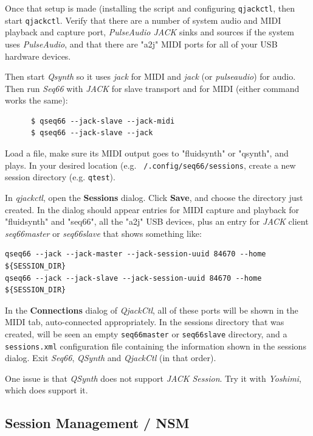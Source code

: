    Once that setup is made (installing the script and configuring
   \texttt{qjackctl}, then start \texttt{qjackctl}.
   Verify that there are a number of system audio and MIDI playback and capture
   port, \textsl{PulseAudio JACK} sinks and sources if the system uses
   \textsl{PulseAudio}, and that there are "a2j" MIDI ports for all of your USB
   hardware devices.

   Then start \textsl{Qsynth} so it uses \textsl{jack} for MIDI and
   \textsl{jack} (or \textsl{pulseaudio}) for audio.
   Then run \textsl{Seq66} with \textsl{JACK} for slave transport and for MIDI
   (either command works the same):

   \begin{verbatim}
      $ qseq66 --jack-slave --jack-midi
      $ qseq66 --jack-slave --jack
   \end{verbatim}

   Load a file, make sure its MIDI output goes to "fluidsynth" or "qsynth", and
   plays.
   In your desired location (e.g. \texttt{~/.config/seq66/sessions},
   create a new session directory (e.g. \texttt{qtest}).

   In \textsl{qjackctl}, open the \textbf{Sessions} dialog.
   Click \textbf{Save}, and choose the directory just created.
   In the dialog should appear entries for MIDI capture and playback for
   "fluidsynth" and "seq66", all the "a2j" USB devices,
   plus an entry for \textsl{JACK} client
   \textsl{seq66master} or \textsl{seq66slave} that shows
   something like:

   \begin{verbatim}
qseq66 --jack --jack-master --jack-session-uuid 84670 --home ${SESSION_DIR}
qseq66 --jack --jack-slave --jack-session-uuid 84670 --home ${SESSION_DIR}
   \end{verbatim}

   In the \textbf{Connections} dialog of \textsl{QjackCtl}, all of these ports
   will be shown in the MIDI tab, auto-connected appropriately.
   In the sessions directory that was created, will be seen an
   empty \texttt{seq66master}
   or \texttt{seq66slave} directory, and a
   \texttt{sessions.xml} configuration file containing the information shown in
   the sessions dialog.
   Exit \textsl{Seq66}, \textsl{QSynth} and \textsl{QjackCtl}
   (in that order).

   One issue is that \textsl{QSynth}
   does not support \textsl{JACK Session}.
   Try it with \textsl{Yoshimi}, which does support it.

\subsection{Session Management / NSM}
\label{subsec:sessions_nsm}

